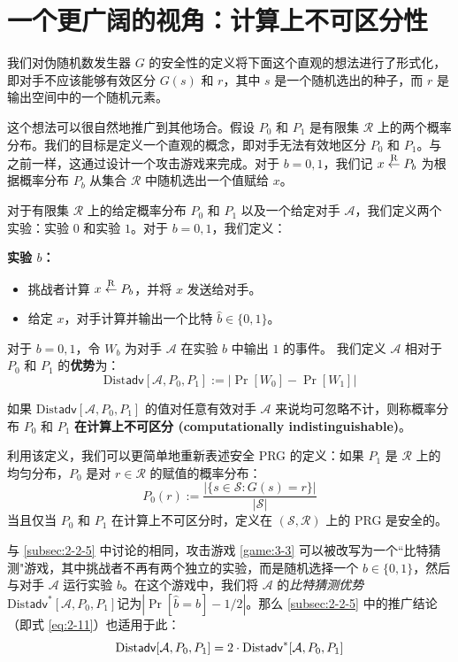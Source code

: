 \section{一个更广阔的视角：计算上不可区分性}

我们对伪随机数发生器 $G$ 的安全性的定义将下面这个直观的想法进行了形式化，即对手不应该能够有效区分 $G(s)$ 和 $r$，其中 $s$ 是一个随机选出的种子，而 $r$ 是输出空间中的一个随机元素。

这个想法可以很自然地推广到其他场合。假设 $P_0$ 和 $P_1$ 是有限集 $\mathcal{R}$ 上的两个概率分布。我们的目标是定义一个直观的概念，即对手无法有效地区分 $P_0$ 和 $P_1$。与之前一样，这通过设计一个攻击游戏来完成。对于 $b=0,1$，我们记 $x\overset{\rm R}\leftarrow P_b$ 为根据概率分布 $P_b$ 从集合 $\mathcal R$ 中随机选出一个值赋给 $x$。

\begin{game}[区分 $P_0$ 和 $P_1$]\label{game:3-3}
对于有限集 $\mathcal{R}$ 上的给定概率分布 $P_0$ 和 $P_1$ 以及一个给定对手 $\mathcal A$，我们定义两个实验：实验 $0$ 和实验 $1$。对于 $b=0,1$，我们定义：

\noindent\textbf{实验 $b$：}
\begin{itemize}
	\item 挑战者计算 $x\overset{\rm R}\leftarrow P_b$，并将 $x$ 发送给对手。
	\item 给定 $x$，对手计算并输出一个比特 $\hat b\in\{0,1\}$。
\end{itemize}

对于 $b=0,1$，令 $W_b$ 为对手 $\mathcal A$ 在实验 $b$ 中输出 $1$ 的事件。 我们定义 $\mathcal A$ 相对于 $P_0$ 和 $P_1$ 的\textbf{优势}为：
\[
\mathrm{Dist}\mathsf{adv}[\mathcal{A},P_0,P_1]:=\big\lvert\Pr[W_0]-\Pr[W_1]\big\rvert
\]
\end{game}

\begin{definition}[计算上不可区分性]\label{def:3-4}
如果 $\mathrm{Dist}\mathsf{adv}[\mathcal{A},P_0,P_1]$ 的值对任意有效对手 $\mathcal A$ 来说均可忽略不计，则称概率分布 $P_0$ 和 $P_1$ \textbf{在计算上不可区分 (computationally indistinguishable)}。
\end{definition}

利用该定义，我们可以更简单地重新表述安全 PRG 的定义：如果 $P_1$ 是 $\mathcal R$ 上的均匀分布，$P_0$ 是对 $r\in\mathcal R$ 的赋值的概率分布：
\[
P_0(r):=\frac{|\{s\in\mathcal{S}:G(s)=r\}|}{|\mathcal{S}|}
\]
当且仅当 $P_0$ 和 $P_1$ 在计算上不可区分时，定义在 $(\mathcal S,\mathcal R)$ 上的 PRG 是安全的。

与 \ref{subsec:2-2-5} 中讨论的相同，攻击游戏 \ref{game:3-3} 可以被改写为一个``比特猜测"游戏，其中挑战者不再有两个独立的实验，而是随机选择一个 $b\in\{0,1\}$，然后与对手 $\mathcal A$ 运行实验 $b$。在这个游戏中，我们将 $\mathcal A$ 的\emph{比特猜测优势}$\mathrm{Dist}\mathsf{adv}^*[\mathcal{A},P_0,P_1]$记为$|\Pr[\hat b=b]-{1}/{2}|$。那么 \ref{subsec:2-2-5} 中的推广结论（即式 \ref{eq:2-11}）也适用于此：
\begin{equation}
{\rm Dist\mathsf{adv}}[\mathcal{A},P_0,P_1]=2\cdot\mathrm{Dist}\mathsf{adv}^*[\mathcal{A},P_0,P_1]
\end{equation}

